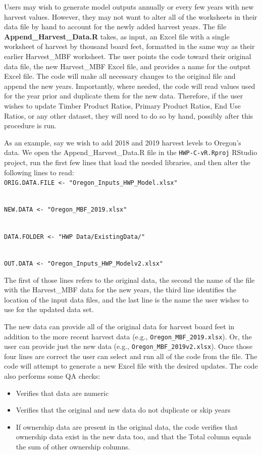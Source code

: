 \documentclass[
  openany]{book}
\begin{document}
Users may wish to generate model outputs annually or every few years with new harvest values. However, they may not want to alter all of the worksheets in their data file by hand to account for the newly added harvest years. The file \textbf{Append\_Harvest\_Data.R} takes, as input, an Excel file with a single worksheet of harvest by thousand board feet, formatted in the same way as their earlier Harvest\_MBF worksheet. The user points the code toward their original data file, the new Harvest\_MBF Excel file, and provides a name for the output Excel file. The code will make all necessary changes to the original file and append the new years. Importantly, where needed, the code will read values used for the year prior and duplicate them for the new data. Therefore, if the user wishes to update Timber Product Ratios, Primary Product Ratios, End Use Ratios, or any other dataset, they will need to do so by hand, possibly after this procedure is run.

As an example, say we wish to add 2018 and 2019 harvest levels to Oregon's data. We open the Append\_Harvest\_Data.R file in the \texttt{HWP-C-vR.Rproj} RStudio project, run the first few lines that load the needed libraries, and then alter the following lines to read:\\
\texttt{ORIG.DATA.FILE\ \textless{}-\ "Oregon\_Inputs\_HWP\_Model.xlsx"}\strut \\
\texttt{NEW.DATA\ \textless{}-\ "Oregon\_MBF\_2019.xlsx"}\strut \\
\texttt{DATA.FOLDER\ \textless{}-\ "HWP\ Data/ExistingData/"}\strut \\
\texttt{OUT.DATA\ \textless{}-\ "Oregon\_Inputs\_HWP\_Modelv2.xlsx"}

The first of those lines refers to the original data, the second the name of the file with the Harvest\_MBF data for the new years, the third line identifies the location of the input data files, and the last line is the name the user wishes to use for the updated data set.

The new data can provide all of the original data for harvest board feet in addition to the more recent harvest data (e.g., \texttt{Oregon\_MBF\_2019.xlsx}). Or, the user can provide just the new data (e.g., \texttt{Oregon\_MBF\_2019v2.xlsx}). Once those four lines are correct the user can select and run all of the code from the file. The code will attempt to generate a new Excel file with the desired updates. The code also performs some QA checks:

\begin{itemize}
\item
  Verifies that data are numeric
\item
  Verifies that the original and new data do not duplicate or skip years
\item
  If ownership data are present in the original data, the code verifies that ownership data exist in the new data too, and that the Total column equals the sum of other ownership columns.
\end{itemize}
\end{document}
